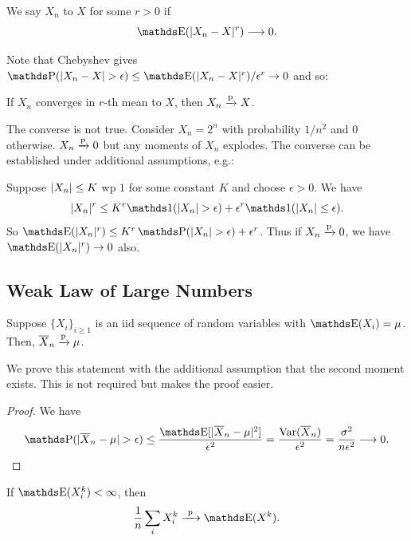 \documentclass[letterpaper, 10pt]{article}
\begin{document}
\begin{definition}
  We say \(X_n\)  to \(X\) for some \(r > 0\) if
  \[
    \E(\abs{X_n - X}^r) \longrightarrow 0.
  \]
\end{definition}
Note that Chebyshev gives \(\P(\abs{X_n - X} > \epsilon) \leq \E(\abs{X_n - X}^r) / \epsilon^r \to 0\) and so:
\begin{proposition}
  If \(X_n\) converges in \(r\)-th mean to  \(X\), then \(X_n \xrightarrow{\mathrm{p}} X\).
\end{proposition}
\begin{example}
  The converse is not true.
  Consider \(X_n = 2^n\) with probability \(1 / n^2\) and \(0\) otherwise.
  \(X_n \xrightarrow{\mathrm{p}} 0\) but any moments of \(X_n\) explodes.
  The converse can be established under additional assumptions, e.g.:

  Suppose \(\lvert X_n\rvert \leq K\) wp \(1\) for some constant \(K\) and choose \(\epsilon > 0\).
  We have
  \[
    \abs{X_n}^r \leq K^r \ind(\abs{X_n} > \epsilon)  + \epsilon^r \ind(\abs{X_n} \leq \epsilon).
  \]
  So \(\E(\abs{X_n}^r) \leq K^r \P(\abs{X_n} > \epsilon) + \epsilon^r\).
  Thus if \(X_n \xrightarrow{\mathrm{p}} 0\), we have \(\E(\abs{X_n}^r) \to 0\) also.
\end{example}


\subsection{Weak Law of Large Numbers}
\begin{theorem}
  Suppose \(\{X_i\}_{i \geq 1}\) is an iid sequence of random variables with \(\E(X_i) = \mu\).
  Then, \(\overline{X}_n \xrightarrow{\mathrm{p}} \mu\).
\end{theorem}
We prove this statement with the additional assumption that the second moment exists.
This is not required but makes the proof easier.
\begin{proof}
  We have
  \[
    \P(\abs{\overline{X}_n - \mu} > \epsilon)
    \leq \frac{\E[ \abs{\overline{X}_n - \mu}^2 ]}{\epsilon^2}
    = \frac{\Var(\overline{X}_n)}{\epsilon^2}
    = \frac{\sigma^2}{n \epsilon^2} \longrightarrow 0.
  \]
\end{proof}



\begin{theorem}
  If \(\E(X_i^k) < \infty\), then
  \[
    \frac{1}{n} \sum_i X_i^k \longprobto \E(X^k).
  \]
\end{theorem}
\end{document}
